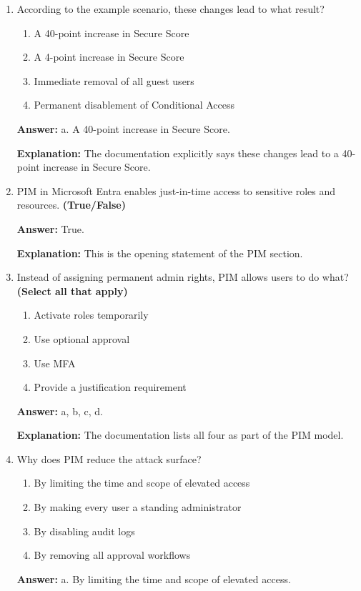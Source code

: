 \documentclass[10pt]{article}
\begin{document}
\begin{enumerate}[leftmargin=*]
\textbf{Explanation:} These are the exact follow-up actions described in the example scenario.

\item According to the example scenario, these changes lead to what result?
\begin{enumerate}[label=\alph*., leftmargin=1.5em]
\item A 40-point increase in Secure Score
\item A 4-point increase in Secure Score
\item Immediate removal of all guest users
\item Permanent disablement of Conditional Access
\end{enumerate}
\textbf{Answer:} a. A 40-point increase in Secure Score.

\textbf{Explanation:} The documentation explicitly says these changes lead to a 40-point increase in Secure Score.

\item PIM in Microsoft Entra enables just-in-time access to sensitive roles and resources. \textbf{(True/False)}

\textbf{Answer:} True.

\textbf{Explanation:} This is the opening statement of the PIM section.

\item Instead of assigning permanent admin rights, PIM allows users to do what? \textbf{(Select all that apply)}
\begin{enumerate}[label=\alph*., leftmargin=1.5em]
\item Activate roles temporarily
\item Use optional approval
\item Use MFA
\item Provide a justification requirement
\end{enumerate}
\textbf{Answer:} a, b, c, d.

\textbf{Explanation:} The documentation lists all four as part of the PIM model.

\item Why does PIM reduce the attack surface?
\begin{enumerate}[label=\alph*., leftmargin=1.5em]
\item By limiting the time and scope of elevated access
\item By making every user a standing administrator
\item By disabling audit logs
\item By removing all approval workflows
\end{enumerate}
\textbf{Answer:} a. By limiting the time and scope of elevated access.


\end{enumerate}
\end{document}
